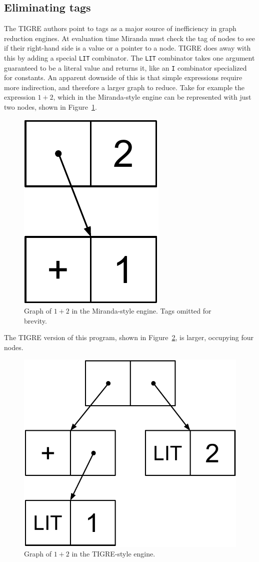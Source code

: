 \documentclass[conference]{IEEEtran}
\begin{document}
\subsection{Eliminating tags}
The TIGRE authors point to tags as a major source of inefficiency in graph reduction engines.
At evaluation time Miranda must check the tag of nodes to see if their right-hand side is a value or a pointer to a node.
TIGRE does away with this by adding a special \texttt{LIT} combinator.
The \texttt{LIT} combinator takes one argument guaranteed to be a literal value and returns it, like an \texttt{I} combinator specialized for constants.
An apparent downside of this is that simple expressions require more indirection, and therefore a larger graph to reduce.
Take for example the expression $1+2$, which in the Miranda-style engine can be represented with just two nodes, shown in Figure~\ref{fig:1_plus_2_miranda}.

\begin{figure}
    \includegraphics[width=.2\columnwidth]{1_plus_2_miranda}
    \centering
    \caption{
        Graph of $1 + 2$ in the Miranda-style engine.
        Tags omitted for brevity.
    }
    \label{fig:1_plus_2_miranda}
\end{figure}

The TIGRE version of this program, shown in Figure~\ref{fig:1_plus_2_tigre}, is larger, occupying four nodes.

\begin{figure}
    \includegraphics[width=.46\columnwidth]{1_plus_2_tigre}
    \centering
    \caption{
        Graph of $1 + 2$ in the TIGRE-style engine.
    }
    \label{fig:1_plus_2_tigre}
\end{figure}
\end{document}
